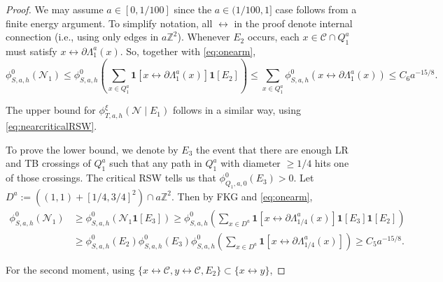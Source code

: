 \documentclass[10pt,a4paper]{amsart}
\begin{document}
\begin{proof}
    We may assume $a\in[0,1/100]$ since the $a\in(1/100,1]$ case follows from a finite energy argument. To simplify notation, all $\longleftrightarrow$ in the proof denote internal connection (i.e., using only edges in $a\mathbb{Z}^2$).
	Whenever $E_2$ occurs, each $x\in \mathscr{C}\cap Q^a_1$ must satisfy $x\longleftrightarrow \partial \Lambda_{1}^a(x)$. So, together with \eqref{eq:onearm},
	\[\phi_{S,a,h}^0(\mathcal{N}_1)\leq \phi_{S,a,h}^0\left(\sum_{x\in Q_1^a}\mathbf{1}[x\longleftrightarrow \partial \Lambda^a_{1}(x)]\mathbf{1}[E_2]\right)\leq \sum_{x\in Q_1^a}\phi_{S,a,h}^0(x\longleftrightarrow \partial \Lambda^a_{1}(x))\leq C_6 a^{-15/8}.\]
	
	The upper bound for $\phi_{T,a,h}^{\xi}(\mathcal{N} \mid E_1)$ follows in a similar way, using \eqref{eq:nearcriticalRSW}.
	
	To prove the lower bound, we denote by $E_3$ the event that there are enough LR and TB crossings of $Q^a_1$ such that any path in $Q_1^a$ with diameter $\geq 1/4$ hits one of those crossings. The critical RSW tells us that $\phi_{Q_1,a,0}^0(E_3)>0$. Let $D^a:=((1,1)+[1/4,3/4]^2)\cap a\mathbb{Z}^2$. Then by FKG and \eqref{eq:onearm}, 
	\begin{align*}
		\phi_{S,a,h}^0(\mathcal{N}_1) &\geq \phi_{S,a,h}^0(\mathcal{N}_1\mathbf{1}[E_3])\geq \phi_{S,a,h}^0\left(\sum_{x\in D^a}\mathbf{1}[x\longleftrightarrow\partial \Lambda_{1/4}^a(x)]\mathbf{1}[E_3]\mathbf{1}[E_2]\right)\\
		&\geq \phi_{S,a,h}^0(E_2)  \phi_{S,a,h}^0(E_3) \phi_{S,a,h}^0\left(\sum_{x\in D^a}\mathbf{1}[x\longleftrightarrow\partial \Lambda_{1/4}^a(x)]\right) \geq C_5 a^{-15/8}.
	\end{align*}

	
	For the second moment, using $\{x \longleftrightarrow \mathscr{C}, y\longleftrightarrow \mathscr{C}, E_2\}\subset \{x \longleftrightarrow y\}$,


\end{proof}
\end{document}

